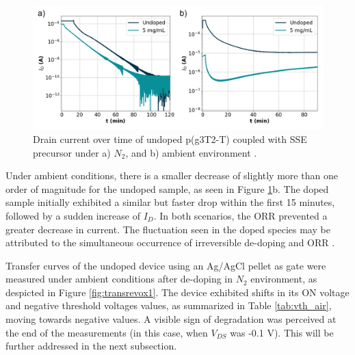\begin{figure}[ht]
    \centering
    \includegraphics[width=\textwidth]{Images/pdf/stability.pdf}
    \caption[Drain current over time of undoped-p(g3T2-T) coupled with SSE precursor]{Drain current over time of undoped p(g3T2-T) coupled with SSE precursor under a) $N_{2}$, and b) ambient environment%
    .}
    \label{fig:revox1}
\end{figure}

Under ambient conditions, there is a smaller decrease of slightly more than one order of magnitude for the undoped sample, as seen in Figure \ref{fig:revox1}b. The doped sample initially exhibited a similar but faster drop within the first 15 minutes, followed by a sudden increase of $I_{D}$. In both scenarios, the ORR prevented a greater decrease in current. The fluctuation seen in the doped species may be attributed to the simultaneous occurrence of irreversible de-doping %
and ORR . %

Transfer curves of the undoped device using an Ag/AgCl pellet as gate were measured under ambient conditions after de-doping in $N_{2}$ environment, as despicted in Figure \ref{fig:transrevox1}. The device exhibited shifts in its ON voltage and negative threshold voltages values, as summarized in Table \ref{tab:vth_air}, moving towards negative values. A visible sign of degradation was perceived at the end of the measurements (in this case, when $V_{DS}$ was -0.1 V). This will be further addressed in the next subsection.

